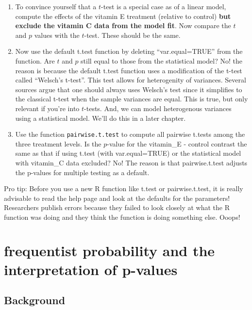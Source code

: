 \documentclass[]{book}
\theoremstyle{definition}
\theoremstyle{definition}
\theoremstyle{definition}
\theoremstyle{remark}
\begin{document}
\begin{enumerate}
\def\labelenumi{\arabic{enumi}.}
\setcounter{enumi}{2}
\item
  To convince yourself that a \(t\)-test is a special case as of a
  linear model, compute the effects of the vitamin E treatment (relative
  to control) \textbf{but exclude the vitamin C data from the model
  fit}. Now compare the \(t\) and \(p\) values with the \(t\)-test.
  These should be the same.
\item
  Now use the default t.test function by deleting ``var.equal=TRUE''
  from the function. Are \(t\) and \(p\) still equal to those from the
  statistical model? No! the reason is because the default t.test
  function uses a modification of the t-test called ``Welsch's t-test''.
  This test allows for heterogenity of variances. Several sources argue
  that one should always uses Welsch's test since it simplifies to the
  classical t-test when the sample variances are equal. This is true,
  but only relevant if you're into \(t\)-tests. And, we can model
  heterogenous variances using a statistical model. We'll do this in a
  later chapter.
\item
  Use the function \texttt{pairwise.t.test} to compute all pairwise
  t.tests among the three treatment levels. Is the \(p\)-value for the
  vitamin\_E - control contrast the same as that if using t.test (with
  var.equal=TRUE) or the statistical model with vitamin\_C data
  excluded? No! The reason is that pairwise.t.test adjusts the p-values
  for multiple testing as a default.
\end{enumerate}

Pro tip: Before you use a new R function like t.test or pairwise.t.test,
it is really advisable to read the help page and look at the defaults
for the parameters! Researchers publish errors because they failed to
look closely at what the R function was doing and they think the
function is doing something else. Ooops!

\section{frequentist probability and the interpretation of
p-values}\label{frequentist-probability-and-the-interpretation-of-p-values}

\subsection{Background}\label{background}
\end{document}
